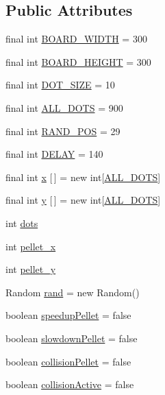 \subsection*{Public Attributes}
\begin{DoxyCompactItemize}
\item 
final int \hyperlink{class_board_a26390bed1bf2786b56e6ce5c8bdfe384}{B\+O\+A\+R\+D\+\_\+\+W\+I\+D\+TH} = 300
\item 
final int \hyperlink{class_board_a17a48c777b0c08986dd2db8837b1199d}{B\+O\+A\+R\+D\+\_\+\+H\+E\+I\+G\+HT} = 300
\item 
final int \hyperlink{class_board_a142327cbac30c9c8831b197cdd2e9a36}{D\+O\+T\+\_\+\+S\+I\+ZE} = 10
\item 
final int \hyperlink{class_board_afc3dba6349ee431f748fdcaee99b78b7}{A\+L\+L\+\_\+\+D\+O\+TS} = 900
\item 
final int \hyperlink{class_board_a7e683d47d45e3734833860cda1993366}{R\+A\+N\+D\+\_\+\+P\+OS} = 29
\item 
final int \hyperlink{class_board_a05fa7c307d2fc9f2813a728a85d1dad4}{D\+E\+L\+AY} = 140
\item 
final int \hyperlink{class_board_a1644d1bf67cadaa59812ec1b5d9d5a19}{x} \mbox{[}$\,$\mbox{]} = new int\mbox{[}\hyperlink{class_board_afc3dba6349ee431f748fdcaee99b78b7}{A\+L\+L\+\_\+\+D\+O\+TS}\mbox{]}
\item 
final int \hyperlink{class_board_a8bcec6f1642775fa45aa60e0710732a4}{y} \mbox{[}$\,$\mbox{]} = new int\mbox{[}\hyperlink{class_board_afc3dba6349ee431f748fdcaee99b78b7}{A\+L\+L\+\_\+\+D\+O\+TS}\mbox{]}
\item 
int \hyperlink{class_board_ac2d4eeff3a96ccb227e8cc38ff803d50}{dots}
\item 
int \hyperlink{class_board_ad10f2e196700bf4db295150b320b1f07}{pellet\+\_\+x}
\item 
int \hyperlink{class_board_a9ef3d56a9df039b5b1c6a7172e77d233}{pellet\+\_\+y}
\item 
Random \hyperlink{class_board_a437c36e144698e50f2a842d4b60979e3}{rand} = new Random()
\item 
boolean \hyperlink{class_board_a57b230f404f9f86d8ed741d25e8dcfc3}{speedup\+Pellet} = false
\item 
boolean \hyperlink{class_board_a79cef3a39a5160aa365ab9e37a768850}{slowdown\+Pellet} = false
\item 
boolean \hyperlink{class_board_add2714db81c1d069077b60f04efecf58}{collision\+Pellet} = false
\item 
boolean \hyperlink{class_board_ae1480c275ddcb277be70a914e5f90da6}{collision\+Active} = false

\end{DoxyCompactItemize}
